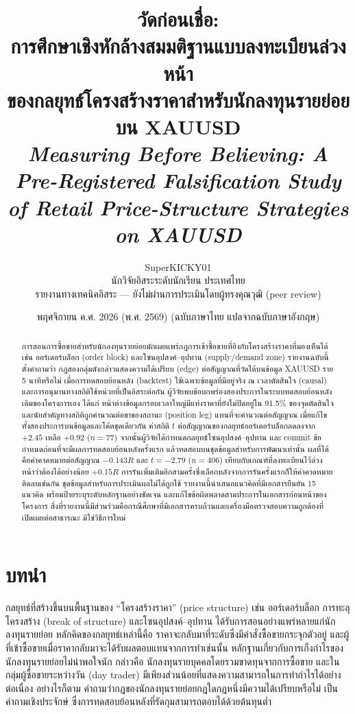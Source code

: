 \documentclass[11pt,a4paper]{article}
\title{วัดก่อนเชื่อ:\\[2pt]
\large การศึกษาเชิงหักล้างสมมติฐานแบบลงทะเบียนล่วงหน้า\\ของกลยุทธ์โครงสร้างราคาสำหรับนักลงทุนรายย่อยบน XAUUSD\\[4pt]
\normalsize\emph{Measuring Before Believing: A Pre-Registered Falsification Study of Retail
Price-Structure Strategies on XAUUSD}}
\author{SuperKICKY01\\\small นักวิจัยอิสระระดับนักเรียน ประเทศไทย\\\small รายงานทางเทคนิคอิสระ ---
ยังไม่ผ่านการประเมินโดยผู้ทรงคุณวุฒิ (peer review)}
\date{พฤศจิกายน ค.ศ. 2026 (พ.ศ. 2569) \quad (ฉบับภาษาไทย แปลจากฉบับภาษาอังกฤษ)}
\newcommand{\R}{\ensuremath{R}}
\newcommand{\tw}[1]{\texorpdfstring{\hspace{0pt}\mbox{#1}\hspace{0pt}}{#1}}
\begin{document}
\maketitle

\begin{abstract}
\noindent
การสอนการ\tw{ซื้อขาย}สำหรับนักลงทุน\tw{รายย่อย}มักเผยแพร่กฎการเข้า\tw{ซื้อขาย}ที่อิงกับโครงสร้างราคาที่มองเห็นได้
เช่น \tw{ออร์เดอร์บล็อก} (order block) และโซนอุปสงค์--อุปทาน (supply/demand zone)
รายงานฉบับนี้ตั้งคำถามว่า กฎสองกลุ่มดังกล่าวแสดงความได้เปรียบ (edge) ต่อสัญญาณที่วัดได้บนข้อมูล
XAUUSD ราย 5 นาทีหรือไม่ เมื่อการทดสอบย้อนหลัง (backtest) ใช้เฉพาะข้อมูลที่มีอยู่จริง ณ เวลา\tw{ตัดสินใจ}
(causal) และการอนุมานทางสถิติใช้หน่วยที่เป็นอิสระต่อกัน ผู้วิจัยพบข้อบกพร่องสองประการในระบบทดสอบย้อนหลังเดิมของโครงการเอง
ได้แก่ หน้าต่างข้อมูลกรอบเวลาใหญ่มีแท่งราคาที่ยังไม่ปิดอยู่ใน 91.5\% ของจุด\tw{ตัดสินใจ}
และนัยสำคัญทางสถิติถูกคำนวณต่อขาของสถานะ (position leg) แทนที่จะคำนวณต่อสัญญาณ
เมื่อแก้ไขทั้งสองประการบนข้อมูลและโค้ดชุดเดียวกัน ค่าสถิติ $t$ ต่อสัญญาณของกลยุทธ์\tw{ออร์เดอร์บล็อก}ลดลงจาก
$+2.45$ เหลือ $+0.92$ ($n=77$) จากนั้นผู้วิจัยได้กำหนดกลยุทธ์โซนอุปสงค์--อุปทาน
และ commit ข้อกำหนดก่อนที่จะมีผลการทดสอบย้อนหลัง\tw{ครั้งแรก} แล้วทดสอบบนชุดข้อมูลสำหรับการพัฒนาเท่านั้น
ผลที่ได้คือ\tw{ค่าคาดหมาย}ต่อสัญญาณ $-0.143\R$ และ $t=-2.79$ ($n=406$)
เทียบกับเกณฑ์ที่ลงทะเบียนไว้\tw{ล่วงหน้า}ว่าต้องได้\tw{อย่างน้อย} $+0.15\R$
การรันเพิ่มเติมอีกสามครั้งซึ่งเลือกหลังจากการรัน\tw{ครั้งแรก}ก็ให้\tw{ค่าคาดหมาย}ติดลบเช่นกัน
ชุดข้อมูลสำหรับการประเมินผลไม่ได้ถูกใช้ รายงานนี้นำเสนอ\tw{แนวคิดที่}มีเอกสารยืนยัน 15 แนวคิด
พร้อมป้ายระบุระดับ\tw{หลักฐาน}อย่างชัดเจน และแก้ไขข้อผิดพลาดสามประการในเอกสารก่อนหน้าของโครงการ
สิ่งที่รายงานนี้มีส่วนร่วมคือกรณีศึกษาที่มีเอกสารครบถ้วนและ\tw{เครื่องมือ}\tw{ตรวจสอบ}ความถูกต้องที่เปิดเผยต่อสาธารณะ
มิใช่วิธีการใหม่
\end{abstract}

\section{บทนำ}

กลยุทธ์ที่สร้างขึ้นบนพื้นฐานของ ``โครงสร้างราคา'' (price structure) เช่น \tw{ออร์เดอร์บล็อก}
การทะลุโครงสร้าง (break of structure) และโซนอุปสงค์--อุปทาน
\tw{ได้รับ}การสอนอย่างแพร่หลายแก่นักลงทุน\tw{รายย่อย} หลักคิดของกลยุทธ์เหล่านี้คือ
ราคาจะกลับมาที่ระดับซึ่งมี\tw{คำสั่ง}\tw{ซื้อขาย}กระจุกตัวอยู่ และผู้ที่เข้า\tw{ซื้อขาย}เมื่อราคากลับมาจะ\tw{ได้รับ}ผลตอบแทนจากการทำเช่นนั้น
\tw{หลักฐาน}เกี่ยวกับการเก็งกำไรของนักลงทุน\tw{รายย่อย}ไม่น่าพอใจนัก
กล่าวคือ นักลงทุนรายบุคคลโดยรวมขาดทุนจากการ\tw{ซื้อขาย} \citep{barber2009lose}
และในกลุ่มผู้\tw{ซื้อขาย}ระหว่างวัน (day trader) มีเพียงส่วนน้อยที่แสดงความสามารถในการทำกำไรได้อย่างต่อเนื่อง
\citep{barber2014daytrading} อย่างไรก็ตาม คำถามว่ากฎของนักลงทุน\tw{รายย่อย}กฎใดกฎหนึ่งมีความได้เปรียบหรือไม่
เป็นคำถามเชิงประจักษ์ ซึ่งการทดสอบย้อนหลังที่รัดกุมสามารถตอบได้ด้วยต้นทุนต่ำ
\end{document}
